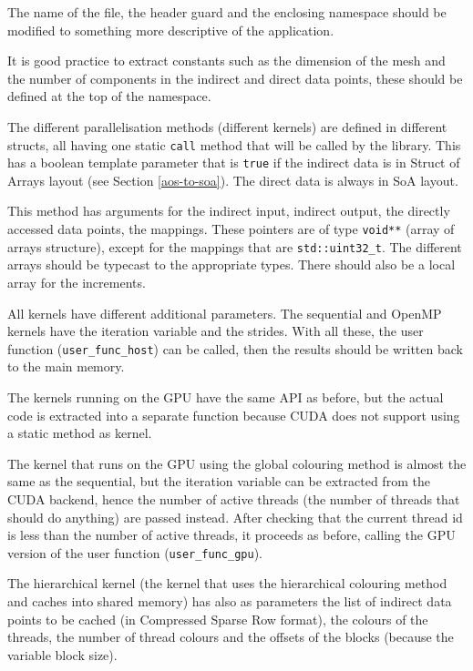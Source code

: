 The name of the file, the header guard and the enclosing namespace should be
modified to something more descriptive of the application.

It is good practice to extract constants such as the dimension of the mesh and
the number of components in the indirect and direct data points, these should be
defined at the top of the namespace.

The different parallelisation methods (different kernels) are defined in
different structs, all having one static \lstinline!call! method that will be
called by the library. This has a boolean template parameter that is
\lstinline!true! if the indirect data is in Struct of Arrays layout (see Section
\ref{aos-to-soa}). The direct data is always in SoA layout.

This method has arguments for the indirect input, indirect output, the directly
accessed data points, the mappings. These pointers are of type
\lstinline!void**! (array of arrays structure), except for the mappings that are
\lstinline!std::uint32_t!. The different arrays should be typecast to the
appropriate types. There should also be a local array for the increments.

All kernels have different additional parameters. The sequential and OpenMP
kernels have the iteration variable and the strides. With all these, the user
function (\lstinline!user_func_host!) can be called, then the results should be
written back to the main memory.

The kernels running on the GPU have the same API as before, but the actual code
is extracted into a separate function because CUDA does not support using a
static method as kernel.

The kernel that runs on the GPU using the global colouring method is almost the
same as the sequential, but the iteration variable can be extracted from the
CUDA backend, hence the number of active threads (the number of threads that
should do anything) are passed instead.  After checking that the current thread
id is less than the number of active threads, it proceeds as before, calling the
GPU version of the user function (\lstinline!user_func_gpu!).

The hierarchical kernel (the kernel that uses the hierarchical colouring method
and caches into shared memory) has also as parameters the list of indirect data
points to be cached (in Compressed Sparse Row format), the colours of the
threads, the number of thread colours and the offsets of the blocks (because the
variable block size).

